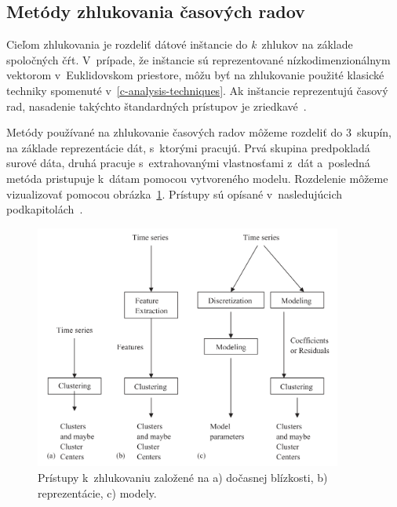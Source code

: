 \documentclass[a4paper,twoside,slovak,12pt,appendix]{article}
\begin{document}


\subsection{Metódy zhlukovania časových radov}
Cieľom zhlukovania je rozdeliť dátové inštancie do \textit{k}~zhlukov na základe
spoločných čŕt. V~prípade, že inštancie sú reprezentované nízkodimenzionálnym
vektorom v~Euklidovskom priestore, môžu byť na zhlukovanie použité klasické
techniky spomenuté v~\ref{c-analysis-techniques}. Ak inštancie reprezentujú
časový rad, nasadenie takýchto štandardných prístupov je
zriedkavé~\cite{Hautamaki2008}.

Metódy používané na zhlukovanie časových radov môžeme rozdeliť do 3~skupín, na
základe reprezentácie dát, s~ktorými pracujú. Prvá skupina predpokladá surové
dáta, druhá pracuje s~extrahovanými vlastnosťami z~dát a~posledná metóda
pristupuje k~dátam pomocou vytvoreného modelu. Rozdelenie môžeme vizualizovať
pomocou obrázka~\ref{fig:clustering-approaches}. Prístupy sú opísané
v~nasledujúcich podkapitolách~\cite{Rani2012}.

\begin{figure}[]
  \centering
  \includegraphics[width=0.9\textwidth]{clustering_approaches.png}
  \caption{Prístupy k~zhlukovaniu založené na a) dočasnej blízkosti, b) reprezentácie, c) modely.}
  \label{fig:clustering-approaches}
\end{figure}
\end{document}
